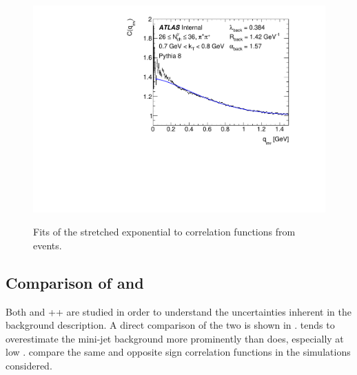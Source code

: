 \begin{figure}[t]
\begin{minipage}[t]{1.0\textwidth}
\includegraphics[width=.49\linewidth]{Cqinv_pythia_cent7_e1_kt6.pdf}\\
\end{minipage}
\caption{Fits of the stretched exponential to correlation functions from \PYEight events.}
\label{fig:pythia_bckg_fit_cent7}
\end{figure}


\subsection{Comparison of \Herwig and \PYEight}
\label{subsec:herwig_vs_pythia}

Both \PYEight and \Herwig++ are studied in order to understand the uncertainties inherent in the background description.
A direct comparison of the two is shown in .
\Herwig tends to overestimate the mini-jet background more prominently than \PYEight does, especially at low \kt.
 compare the same and opposite sign correlation functions in the simulations considered.

